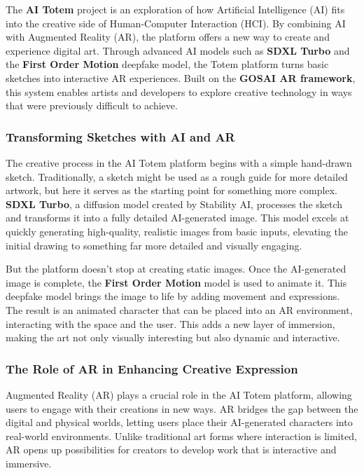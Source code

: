 The \textbf{AI Totem} project is an exploration of how Artificial Intelligence (AI) fits into the creative side of Human-Computer Interaction (HCI).
By combining AI with Augmented Reality (AR), the platform offers a new way to create and experience digital art.
Through advanced AI models such as \textbf{SDXL Turbo} and the \textbf{First Order Motion} deepfake model, the Totem platform turns basic sketches into interactive AR experiences.
Built on the \textbf{GOSAI AR framework}, this system enables artists and developers to explore creative technology in ways that were previously difficult to achieve.

\subsubsection{ Transforming Sketches with AI and AR}

The creative process in the AI Totem platform begins with a simple hand-drawn sketch.
Traditionally, a sketch might be used as a rough guide for more detailed artwork, but here it serves as the starting point for something more complex.
\textbf{SDXL Turbo}, a diffusion model created by Stability AI, processes the sketch and transforms it into a fully detailed AI-generated image.
This model excels at quickly generating high-quality, realistic images from basic inputs, elevating the initial drawing to something far more detailed and visually engaging.

But the platform doesn’t stop at creating static images.
Once the AI-generated image is complete, the \textbf{First Order Motion} model is used to animate it.
This deepfake model brings the image to life by adding movement and expressions.
The result is an animated character that can be placed into an AR environment, interacting with the space and the user. This adds a new layer of immersion, making the art not only visually interesting but also dynamic and interactive.

\subsubsection{ The Role of AR in Enhancing Creative Expression}

Augmented Reality (AR) plays a crucial role in the AI Totem platform, allowing users to engage with their creations in new ways.
AR bridges the gap between the digital and physical worlds, letting users place their AI-generated characters into real-world environments.
Unlike traditional art forms where interaction is limited, AR opens up possibilities for creators to develop work that is interactive and immersive.


